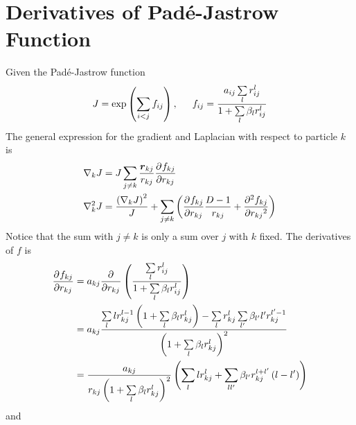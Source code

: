 \section{Derivatives of Pad\'e-Jastrow Function}
    Given the Pad\'e-Jastrow function
        \begin{equation}
            J = \exp\left(\sum\limits_{i<j}f_{ij}\right) ,\indent f_{ij} =
            \frac{a_{ij}\sum\limits_l r^l_{ij}}{1 + \sum\limits_l \beta_l
            r^l_{ij}}
        \end{equation}
    The general expression for the gradient and Laplacian with respect to
    particle $k$ is
        \begin{equation}
            \begin{aligned}
                \nabla_k J &= J\sum_{j\neq k} \frac{\blds{r}_{kj}}{r_{kj}}
                \prd{r_{kj}}[f_{kj}] \\
                \nabla^2_k J &= \frac{\left(\nabla_k J\right)^2}{J} +
                \sum_{j\neq k} \left(\prd{r_{kj}}[f_{kj}] \frac{D-1}{r_{kj}} +
                \prd{r_{kj}}[f_{kj}][2]\right)
            \end{aligned}
        \end{equation}
    Notice that the sum with $j\neq k$ is only a sum over $j$ with $k$ fixed.
    The derivatives of $f$ is
        \begin{align}
            \prd{r_{kj}}[f_{kj}] &= a_{kj}\prd{r_{kj}}
            \left(\frac{\sum\limits_l r^l_{ij}}{1 + \sum\limits_l \beta_l
            r^l_{ij}}\right) \nonumber \\
            &= a_{kj}\frac{\sum\limits_llr^{l-1}_{kj}\left(1 + \sum\limits_l
            \beta_l r^l_{kj}\right) - \sum\limits_l
            r^l_{kj}\sum\limits_{l'}\beta_{l'}l'r^{l'-1}_{kj}}{\left(1 +
            \sum\limits_l\beta_lr^l_{kj}\right)^2} \nonumber \\
            &= \frac{a_{kj}}{r_{kj}\left(1 +
            \sum\limits_l\beta_lr^l_{kj}\right)^2} \left(\sum_l lr^l_{kj} +
            \sum_{ll'}\beta_{l'}r^{l+l'}_{kj}\left(l-l'\right)\right)
        \end{align}
    and
